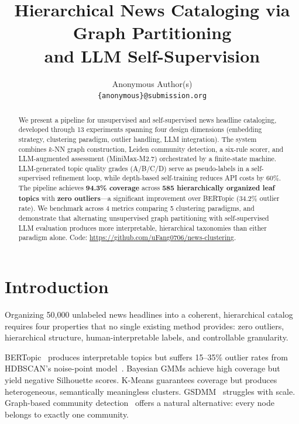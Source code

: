 \documentclass[10pt,twocolumn,twoside]{article}
\title{\textbf{Hierarchical News Cataloging via Graph Partitioning\\and LLM Self-Supervision}}
\author{Anonymous Author(s)\\\texttt{\{anonymous\}@submission.org}}
\date{}
\begin{document}
\maketitle

\begin{abstract}
We present a pipeline for unsupervised and self-supervised news headline cataloging, 
developed through 13 experiments spanning four design dimensions (embedding strategy, clustering 
paradigm, outlier handling, LLM integration). The system combines $k$-NN graph construction, 
Leiden community detection, a six-rule scorer, and LLM-augmented assessment (MiniMax-M2.7) 
orchestrated by a finite-state machine. LLM-generated topic quality grades (A/B/C/D) serve 
as pseudo-labels in a self-supervised refinement loop, while depth-based self-training 
reduces API costs by 60\%. The pipeline achieves \textbf{94.3\% coverage} across \textbf{585 
hierarchically organized leaf topics} with \textbf{zero outliers}---a significant improvement 
over BERTopic (34.2\% outlier rate). We benchmark across 4 metrics comparing 5 clustering 
paradigms, and demonstrate that alternating unsupervised graph partitioning with 
self-supervised LLM evaluation produces more interpretable, hierarchical taxonomies than 
either paradigm alone. Code: \url{https://github.com/uFang0706/news-clustering}.
\end{abstract}

\section{Introduction}

Organizing 50,000 unlabeled news headlines into a coherent, hierarchical catalog requires 
four properties that no single existing method provides: zero outliers, hierarchical structure, 
human-interpretable labels, and controllable granularity.

BERTopic~\cite{grootendorst2022bertopic} produces interpretable topics but suffers 15--35\% 
outlier rates from HDBSCAN's noise-point model~\cite{mcinnes2017hdbscan}. Bayesian GMMs 
achieve high coverage but yield negative Silhouette scores. K-Means guarantees coverage 
but produces heterogeneous, semantically meaningless clusters. GSDMM~\cite{yin2014gsdmm} 
struggles with scale. Graph-based community detection~\cite{newman2006modularity,traag2019leiden} 
offers a natural alternative: every node belongs to exactly one community.
\end{document}
